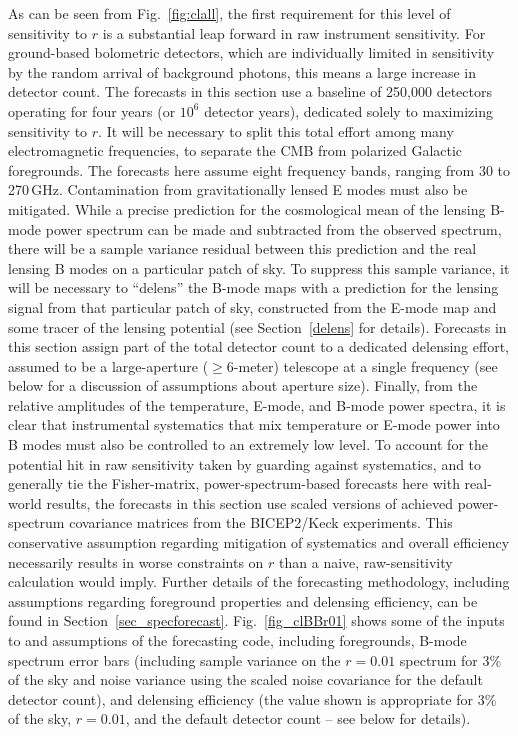 As can be seen from Fig.~\ref{fig:clall}, the first requirement for this level of sensitivity to $r$ is a substantial leap forward in raw instrument sensitivity. 
For ground-based bolometric detectors, which are individually limited in sensitivity by the random arrival of background photons, this means a large increase in detector count. 
The forecasts in this section use a baseline of 250,000 detectors operating for four years (or $10^6$ detector years), dedicated solely to maximizing sensitivity to $r$. 
It will be necessary to split this total effort among many electromagnetic frequencies, to separate the CMB from polarized Galactic foregrounds. %
The forecasts here assume eight frequency bands, ranging from 30 to 270\,GHz.
Contamination from gravitationally lensed E modes must also be mitigated.
While a precise prediction for the cosmological mean of the lensing B-mode power spectrum can be made and subtracted from the observed spectrum, there will be a sample variance residual between this prediction and the real lensing B modes on a particular patch of sky.
To suppress this sample variance, it will be necessary to ``delens'' the B-mode maps with a prediction for the lensing signal from that particular patch of sky, constructed from the E-mode map and some tracer of the lensing potential (see Section~\ref{delens} for details).
Forecasts in this section assign part of the total detector count to a dedicated delensing effort, assumed to be a large-aperture ($\ge 6$-meter) telescope at a single frequency
(see below for a discussion of assumptions about aperture size).
Finally, from the relative amplitudes of the temperature, E-mode, and B-mode power spectra, it is clear that instrumental systematics that mix temperature or E-mode power into B modes must also be controlled to an extremely low level. 
To account for the potential hit in raw sensitivity taken by guarding against systematics, and to generally tie the Fisher-matrix, power-spectrum-based forecasts here with real-world results, the forecasts in this section use scaled versions of achieved power-spectrum covariance matrices from the BICEP2/Keck experiments.
This conservative assumption regarding mitigation of systematics and overall efficiency necessarily results in worse constraints on $r$ than a naive, raw-sensitivity calculation would imply.
Further details of the forecasting methodology, including assumptions regarding foreground properties and delensing efficiency, can be found in Section~\ref{sec_specforecast}.
Fig.~\ref{fig_clBBr01} shows some of the inputs to and assumptions of the forecasting code, including foregrounds, B-mode spectrum error bars (including sample variance on the $r=0.01$ spectrum for 3\% of the sky and noise variance using the scaled noise covariance for the default detector count), and delensing efficiency (the value shown is appropriate for 3\% of the sky, $r=0.01$, and the default detector count -- see below for details).


